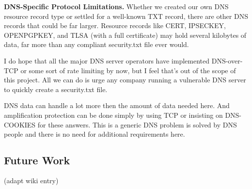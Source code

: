 \textbf{DNS-Specific Protocol Limitations.}    Whether we created our own DNS
resource record type or settled for a well-known TXT record, there are other DNS
records that could be far larger. Resource records like CERT, IPSECKEY,
OPENPGPKEY, and TLSA (with a full certificate) may hold several kilobytes of
data, far more than any compliant security.txt file ever would.

I do hope that all the major DNS server operators have implemented DNS-over-TCP
or some sort of rate limiting by now, but I feel that's out of the scope of this
project. All we can do is urge any company running a vulnerable DNS server to
quickly create a security.txt file.

DNS data can handle a lot more then the amount of data needed here. And
amplification protection can be done simply by using TCP or insisting on
DNS-COOKIES for these answers. This is a generic DNS problem is solved by DNS
people and there is no need for additional requirements here.

\subsection{Future Work}

(adapt wiki entry)
